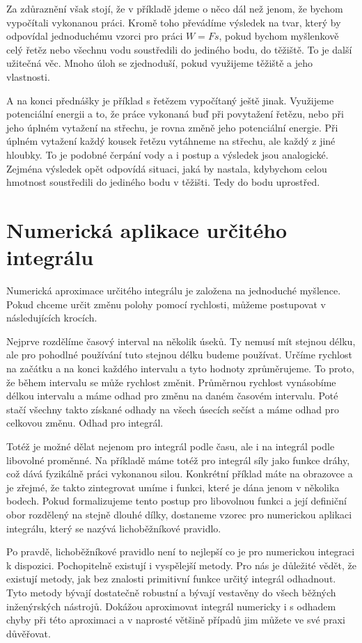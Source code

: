 \documentclass[12pt]{article}
\begin{document}
Za zdůraznění však stojí, že v příkladě jdeme o něco dál než jenom, že bychom vypočítali vykonanou práci. Kromě toho převádíme výsledek na tvar, který by odpovídal jednoduchému vzorci pro práci $W=Fs$, pokud bychom myšlenkově celý řetěz nebo všechnu vodu soustředili do jediného bodu, do těžiště. To je další užitečná věc. Mnoho úloh se zjednoduší, pokud využijeme těžiště a jeho vlastnosti. 

A na konci přednášky je příklad s řetězem vypočítaný ještě jinak. Využijeme potenciální energii a to, že práce vykonaná buď při povytažení řetězu, nebo při jeho úplném vytažení na střechu, je rovna změně jeho potenciální energie. Při úplném vytažení každý kousek řetězu vytáhneme na střechu, ale každý z jiné hloubky. To je podobné čerpání vody a i postup a výsledek jsou analogické. Zejména  výsledek opět odpovídá situaci, jaká by nastala, kdybychom celou hmotnost soustředili do jediného bodu v těžišti. Tedy do bodu uprostřed.

\section*{Numerická aplikace určitého integrálu}

Numerická aproximace určitého integrálu je založena na jednoduché myšlence. Pokud chceme určit změnu polohy pomocí rychlosti, můžeme postupovat v následujících krocích.

Nejprve rozdělíme časový interval na několik úseků. Ty nemusí mít stejnou délku, ale pro pohodlné používání tuto stejnou délku budeme používat. Určíme rychlost na začátku a na konci každého intervalu a tyto hodnoty zprůměrujeme. To proto, že během intervalu se může rychlost změnit. Průměrnou rychlost vynásobíme délkou intervalu a máme odhad pro změnu na daném časovém intervalu. Poté stačí všechny takto získané odhady na všech úsecích sečíst a máme odhad pro celkovou změnu. Odhad pro integrál.

Totéž je možné dělat nejenom pro integrál podle času, ale i na integrál podle libovolné proměnné. Na příkladě máme totéž pro integrál síly jako funkce dráhy, což dává fyzikálně práci vykonanou silou. Konkrétní příklad máte na obrazovce a je zřejmé, že takto zintegrovat umíme i funkci, které je dána jenom v několika bodech. Pokud formalizujeme tento postup pro libovolnou funkci a její definiční obor rozdělený na stejně dlouhé dílky, dostaneme vzorec pro numerickou aplikaci integrálu, který se nazývá lichoběžníkové pravidlo.

Po pravdě, lichoběžníkové pravidlo není to nejlepší co je pro numerickou integraci k dispozici. Pochopitelně existují i vyspělejší metody. Pro nás je důležité vědět, že existují metody, jak bez znalosti primitivní funkce určitý integrál odhadnout. Tyto metody bývají dostatečně robustní a bývají vestavěny do všech běžných inženýrských nástrojů. Dokážou aproximovat integrál numericky i s odhadem chyby při této aproximaci a v naprosté většině případů jim můžete ve své praxi důvěřovat. 
\end{document}
